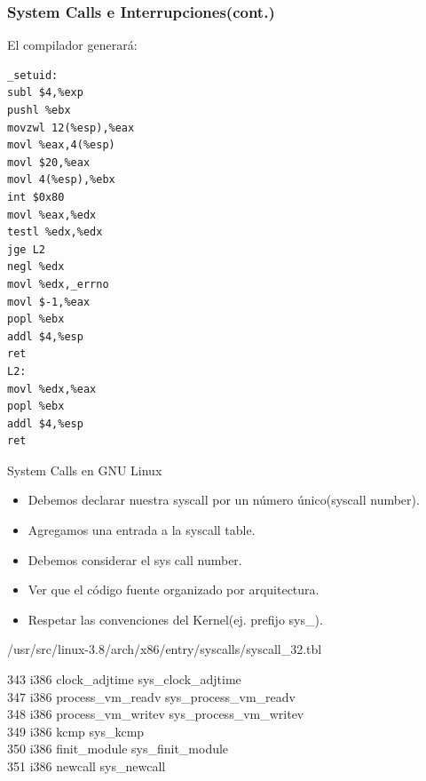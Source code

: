 \begin{frame}[fragile]
\frametitle{System Calls e Interrupciones(cont.)}
El compilador generará:
\begin{lstlisting}
_setuid:
subl $4,%exp
pushl %ebx
movzwl 12(%esp),%eax
movl %eax,4(%esp)
movl $20,%eax
movl 4(%esp),%ebx
int $0x80
movl %eax,%edx
testl %edx,%edx
jge L2
negl %edx
movl %edx,_errno
movl $-1,%eax
popl %ebx
addl $4,%esp
ret
L2:
movl %edx,%eax
popl %ebx
addl $4,%esp
ret

\end{lstlisting}
\end{frame}

\begin{frame}{System Calls en GNU Linux}
   \begin{itemize}  
   \item Debemos declarar nuestra syscall por un número único(syscall number). 
   \item Agregamos una entrada a la syscall table.
   \item Debemos considerar el sys call number.
   \item Ver que el código fuente organizado por arquitectura.
   \item Respetar las convenciones del Kernel(ej. prefijo sys\_).
 \end{itemize}

\begin{block}{/usr/src/linux-3.8/arch/x86/entry/syscalls/syscall\_32.tbl}
  \begin{block}{}
     343     i386    clock\_adjtime            sys\_clock\_adjtime    \\           
     347     i386    process\_vm\_readv        sys\_process\_vm\_readv  \\          
     348     i386    process\_vm\_writev       sys\_process\_vm\_writev \\          
     349     i386    kcmp                      sys\_kcmp \\
     350     i386    finit\_module             sys\_finit\_module \\
     \alert{351     i386    newcall                   sys\_newcall} \\ 
  \end{block}

\end{block}

\end{frame}


